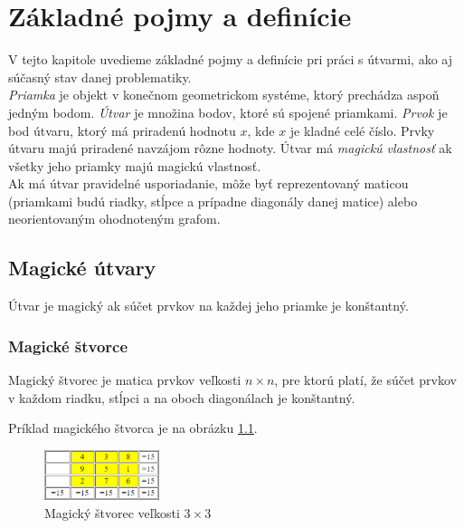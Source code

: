 \chapter{Základné pojmy a definície}

\label{kap:definitions} %

V tejto kapitole uvedieme základné pojmy a definície pri práci s útvarmi, ako aj súčasný stav danej problematiky. \\

\textit{Priamka} je objekt v konečnom geometrickom systéme, ktorý prechádza aspoň jedným bodom. \textit{Útvar} je množina bodov, ktoré sú spojené priamkami. \textit{Prvok} je bod útvaru, ktorý má priradenú hodnotu $x$, kde $x$ je kladné celé číslo. Prvky útvaru majú priradené navzájom rôzne hodnoty. Útvar má \textit{magickú vlastnosť} ak všetky jeho priamky majú magickú vlastnosť. \\

Ak má útvar pravidelné usporiadanie, môže byť reprezentovaný maticou (priamkami budú riadky, stĺpce a prípadne diagonály danej matice) alebo neorientovaným ohodnoteným grafom.

\section{Magické útvary}
\begin{definition} Útvar je magický ak súčet prvkov na každej jeho priamke je konštantný.
\end{definition}

\subsection{Magické štvorce}
\begin{definition} Magický štvorec je matica prvkov veľkosti $n \times n$, pre ktorú platí, že súčet prvkov v každom riadku, stĺpci a na oboch diagonálach je konštantný.
\end{definition}

Príklad magického štvorca je na obrázku \ref{obr:fig_basic_magic_3x3}.

\begin{figure}[H]
\centerline{\includegraphics[width=0.3\textwidth]{images/basic_magic_3x3}}
\caption[Magický štvorec veľkosti $3 \times 3$]{Magický štvorec veľkosti $3 \times 3$ \cite{multimagie}}
\label{obr:fig_basic_magic_3x3}
\end{figure}

